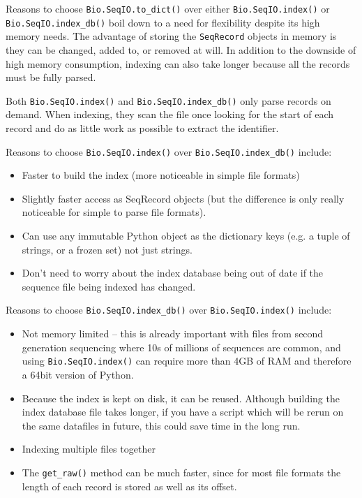 \documentclass{report}
\begin{document}
Reasons to choose \verb|Bio.SeqIO.to_dict()| over either
\verb|Bio.SeqIO.index()| or \verb|Bio.SeqIO.index_db()| boil down to a need
for flexibility despite its high memory needs. The advantage of storing the
\verb|SeqRecord| objects in memory is they can be changed, added to, or
removed at will. In addition to the downside of high memory consumption,
indexing can also take longer because all the records must be fully parsed.

Both \verb|Bio.SeqIO.index()| and \verb|Bio.SeqIO.index_db()| only parse
records on demand. When indexing, they scan the file once looking for the
start of each record and do as little work as possible to extract the
identifier.

Reasons to choose \verb|Bio.SeqIO.index()| over \verb|Bio.SeqIO.index_db()|
include:
\begin{itemize}
\item Faster to build the index (more noticeable in simple file formats)
\item Slightly faster access as SeqRecord objects (but the difference is only
really noticeable for simple to parse file formats).
\item Can use any immutable Python object as the dictionary keys (e.g. a
tuple of strings, or a frozen set) not just strings.
\item Don't need to worry about the index database being out of date if the
sequence file being indexed has changed.
\end{itemize}

Reasons to choose \verb|Bio.SeqIO.index_db()| over \verb|Bio.SeqIO.index()|
include:
\begin{itemize}
\item Not memory limited -- this is already important with files from second
generation sequencing where 10s of millions of sequences are common, and
using \verb|Bio.SeqIO.index()| can require more than 4GB of RAM and therefore
a 64bit version of Python.
\item Because the index is kept on disk, it can be reused. Although building
the index database file takes longer, if you have a script which will be
rerun on the same datafiles in future, this could save time in the long run.
\item Indexing multiple files together
\item The \verb|get_raw()| method can be much faster, since for most file
formats the length of each record is stored as well as its offset.
\end{itemize}
\end{document}
